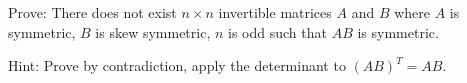


\begin{Exercise}[
name={},
title={}, 
difficulty=0,
origin={\cite{YL}}]
Prove: There does not exist $n\times n$ invertible matrices $A$ and $B$ where $A$ is symmetric, $B$ is skew symmetric, $n$ is odd such that $AB$ is symmetric.
\end{Exercise}

\begin{Answer}
Hint: Prove by contradiction, apply the determinant to $(AB)^T=AB$.
\end{Answer}
